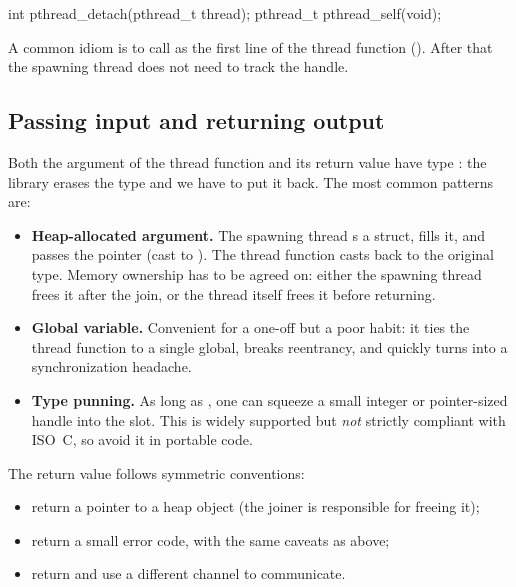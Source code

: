 \begin{codeblock}[language=C]
int  pthread_detach(pthread_t thread);
pthread_t pthread_self(void);
\end{codeblock}

A common idiom is to call  as the first line of the thread function (). After that the spawning thread does not need to track the handle.

\subsection{Passing input and returning output}

Both the argument of the thread function and its return value have type : the library erases the type and we have to put it back. The most common patterns are:

\begin{itemize}
    \item \textbf{Heap-allocated argument.} The spawning thread s a struct, fills it, and passes the pointer (cast to ). The thread function casts back to the original type. Memory ownership has to be agreed on: either the spawning thread frees it after the join, or the thread itself frees it before returning.
    \item \textbf{Global variable.} Convenient for a one-off but a poor habit: it ties the thread function to a single global, breaks reentrancy, and quickly turns into a synchronization headache.
    \item \textbf{Type punning.} As long as , one can squeeze a small integer or pointer-sized handle into the  slot. This is widely supported but \emph{not} strictly compliant with ISO~C, so avoid it in portable code.
\end{itemize}

The return value follows symmetric conventions:

\begin{itemize}[noitemsep]
    \item return a pointer to a heap object (the joiner is responsible for freeing it);
    \item return a small error code, with the same caveats as above;
    \item return  and use a different channel to communicate.
\end{itemize}

